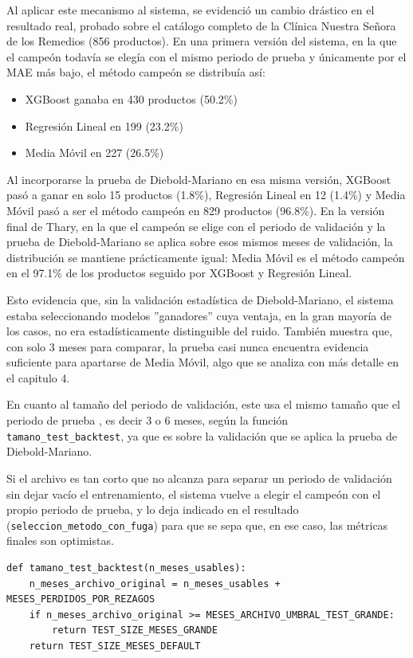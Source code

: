 Al aplicar este mecanismo al sistema, se evidenció un cambio drástico en el resultado real, probado sobre el catálogo completo de la Clínica Nuestra Señora de los Remedios (856 productos). En una primera versión del sistema, en la que el campeón todavía se elegía con el mismo periodo de prueba y únicamente por el MAE más bajo, el método campeón se distribuía así:

\begin{itemize}
    \item XGBoost ganaba en 430 productos (50.2\%)
    \item Regresión Lineal en 199 (23.2\%)
    \item Media Móvil en 227 (26.5\%)

\end{itemize}

Al incorporarse la prueba de Diebold-Mariano en esa misma versión, XGBoost pasó a ganar en solo 15 productos (1.8\%), Regresión Lineal en 12 (1.4\%) y Media Móvil pasó a ser el método campeón en 829 productos (96.8\%).
En la versión final de Thary, en la que el campeón se elige con el periodo de validación y la prueba de Diebold-Mariano se aplica sobre esos mismos meses de validación, la distribución se mantiene prácticamente igual: Media Móvil es el método campeón en el 97.1\% de los productos seguido por XGBoost y Regresión Lineal.

Esto evidencia que, sin la validación estadística de Diebold-Mariano, el sistema estaba seleccionando modelos ”ganadores” cuya ventaja, en la gran mayoría de los casos, no era estadísticamente distinguible del ruido. También muestra que, con solo 3 meses para comparar, la prueba casi nunca encuentra evidencia suficiente para apartarse de Media Móvil, algo que se analiza con más detalle en el capitulo 4.

En cuanto al tamaño del periodo de validación, este usa el mismo tamaño que el periodo de prueba , es decir 3 o 6 meses, según la función \texttt{tamano\_test\_backtest}, ya que es sobre la validación que se aplica la prueba de Diebold-Mariano. 

Si el archivo es tan corto que no alcanza para separar un periodo de validación sin dejar vacío el entrenamiento, el sistema vuelve a elegir el campeón con el propio periodo de prueba, y lo deja indicado en el resultado (\texttt{seleccion\_metodo\_con\_fuga}) para que se sepa que, en ese caso, las métricas finales son optimistas.

\label{lst:campeon_tamano_test}
\begin{verbatim}
def tamano_test_backtest(n_meses_usables):
    n_meses_archivo_original = n_meses_usables + MESES_PERDIDOS_POR_REZAGOS
    if n_meses_archivo_original >= MESES_ARCHIVO_UMBRAL_TEST_GRANDE:
        return TEST_SIZE_MESES_GRANDE
    return TEST_SIZE_MESES_DEFAULT
\end{verbatim}

